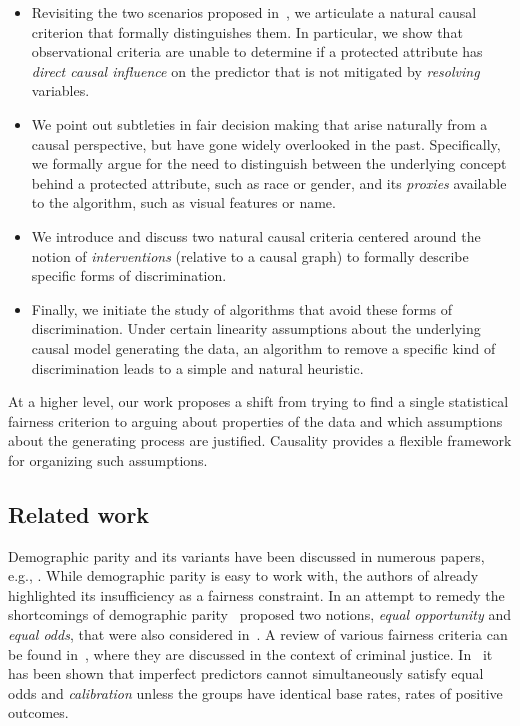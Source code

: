 \begin{itemize}
  \item Revisiting the two scenarios proposed in~\cite{Hardt2016}, we articulate
    a natural causal criterion that formally distinguishes them. In particular,
    we show that observational criteria are unable to determine if a protected
    attribute has \emph{direct causal influence} on the predictor that is not
    mitigated by \emph{resolving} variables.
  \item We point out subtleties in fair decision making that arise naturally
    from a causal perspective, but have gone widely overlooked in the past.
    Specifically, we formally argue for the need to distinguish between the
    underlying concept behind a protected attribute, such as race or gender, and
    its \emph{proxies} available to the algorithm, such as visual features or
    name.
  \item We introduce and discuss two natural causal criteria centered around the
    notion of \emph{interventions} (relative to a causal graph) to formally
    describe specific forms of discrimination.
  \item Finally, we initiate the study of algorithms that avoid these forms of
    discrimination. Under certain linearity assumptions about the underlying
    causal model generating the data, an algorithm to remove a specific kind of
    discrimination leads to a simple and natural heuristic.
\end{itemize}

At a higher level, our work proposes a shift from trying to find a single
statistical fairness criterion to arguing about properties of the data and which
assumptions about the generating process are justified. Causality provides a
flexible framework for organizing such assumptions.

\subsection{Related work}

Demographic parity and its variants have been discussed in numerous papers,
e.g., \cite{Feldman2015, Zemel2013, Zafar2017, Edwards2015}. While demographic
parity is easy to work with, the authors of \cite{Dwork2012} already highlighted
its insufficiency as a fairness constraint. In an attempt to remedy the
shortcomings of demographic parity~\cite{Hardt2016} proposed two notions,
\emph{equal opportunity} and \emph{equal odds}, that were also considered
in~\cite{Zafar2017a}.  A review of various fairness criteria can be found
in~\cite{Berk2017}, where they are discussed in the context of criminal justice.
In~\cite{Kleinberg2016, Chouldechova2016} it has been shown that imperfect
predictors cannot simultaneously satisfy equal odds and \emph{calibration}
unless the groups have identical base rates, \ie{} rates of positive outcomes.


